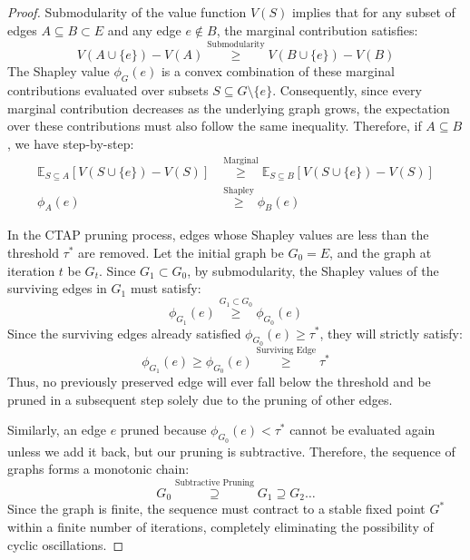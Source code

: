 \documentclass{article}
\begin{document}
\begin{proof}
Submodularity of the value function $V(S)$ implies that for any subset of edges $A \subseteq B \subset E$ and any edge $e \notin B$, the marginal contribution satisfies:
\begin{equation}
    V(A \cup \{e\}) - V(A) \overset{\text{Submodularity}}{\ge} V(B \cup \{e\}) - V(B)
\end{equation}
The Shapley value $\phi_G(e)$ is a convex combination of these marginal contributions evaluated over subsets $S \subseteq G \setminus \{e\}$. Consequently, since every marginal contribution decreases as the underlying graph grows, the expectation over these contributions must also follow the same inequality. Therefore, if $A \subseteq B$, we have step-by-step:
\begin{align}
    \mathbb{E}_{S \subseteq A}[V(S \cup \{e\}) - V(S)] &\overset{\text{Marginal}}{\ge} \mathbb{E}_{S \subseteq B}[V(S \cup \{e\}) - V(S)] \\
    \phi_A(e) &\overset{\text{Shapley}}{\ge} \phi_B(e)
\end{align}

In the CTAP pruning process, edges whose Shapley values are less than the threshold $\tau^*$ are removed. Let the initial graph be $G_0 = E$, and the graph at iteration $t$ be $G_t$. Since $G_1 \subset G_0$, by submodularity, the Shapley values of the surviving edges in $G_1$ must satisfy:
\begin{equation}
    \phi_{G_1}(e) \overset{G_1 \subset G_0}{\ge} \phi_{G_0}(e)
\end{equation}
Since the surviving edges already satisfied $\phi_{G_0}(e) \ge \tau^*$, they will strictly satisfy:
\begin{equation}
    \phi_{G_1}(e) \ge \phi_{G_0}(e) \overset{\text{Surviving Edge}}{\ge} \tau^*
\end{equation}
Thus, no previously preserved edge will ever fall below the threshold and be pruned in a subsequent step solely due to the pruning of other edges.

Similarly, an edge $e$ pruned because $\phi_{G_0}(e) < \tau^*$ cannot be evaluated again unless we add it back, but our pruning is subtractive. Therefore, the sequence of graphs forms a monotonic chain:
\begin{equation}
    G_0 \overset{\text{Subtractive Pruning}}{\supseteq} G_1 \supseteq G_2 \dots
\end{equation}
Since the graph is finite, the sequence must contract to a stable fixed point $G^*$ within a finite number of iterations, completely eliminating the possibility of cyclic oscillations.
\end{proof}
\end{document}
